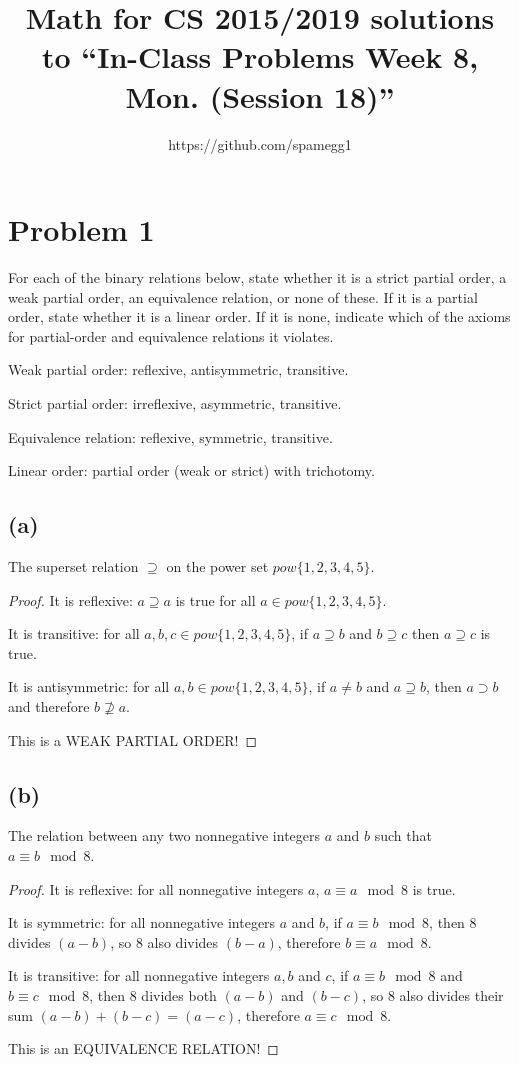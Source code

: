 \documentclass[14pt]{extarticle}
\title{Math for CS 2015/2019 solutions to ``In-Class Problems Week 8, Mon. (Session 18)''}
\author{https://github.com/spamegg1}
\begin{document}
\maketitle
\tableofcontents

\section{Problem 1}
For each of the binary relations below, state whether it is a strict partial order, a weak partial order, an equivalence relation, or none of these. If it is a partial order, state whether it is a linear order. If it is none, indicate which of the axioms for partial-order and equivalence relations it violates.

Weak partial order: reflexive, antisymmetric, transitive.

Strict partial order: irreflexive, asymmetric, transitive.

Equivalence relation: reflexive, symmetric, transitive.

Linear order: partial order (weak or strict) with trichotomy.

\subsection{(a)}
The superset relation $\supseteq$ on the power set $pow\{1, 2, 3, 4, 5\}$.
\begin{proof}
It is reflexive: $a \supseteq a$ is true for all $a \in pow\{1, 2, 3, 4, 5\}$.

It is transitive: for all $a, b, c \in pow\{1, 2, 3, 4, 5\}$, if $a \supseteq b$ and $b \supseteq c$ then $a \supseteq c$ is true.

It is antisymmetric: for all $a, b \in pow\{1,2,3,4,5\}$, if $a \neq b$ and $a \supseteq b$, then $a \supset b$ and therefore $b \nsupseteq a$.

This is a WEAK PARTIAL ORDER!
\end{proof}

\subsection{(b)}
The relation between any two nonnegative integers $a$ and $b$ such that $a \equiv b \mod 8$.
\begin{proof}
It is reflexive: for all nonnegative integers $a$, $a \equiv a \mod 8$ is true.

It is symmetric: for all nonnegative integers $a$ and $b$, if $a \equiv b \mod 8$, then 8 divides $(a - b)$, so 8 also divides $(b-a)$, therefore $b \equiv a \mod 8$.

It is transitive: for all nonnegative integers $a, b$ and $c$, if $a \equiv b \mod 8$ and $b \equiv c \mod 8$, then 8 divides both $(a-b)$ and $(b-c)$, so 8 also divides their sum $(a - b) + (b - c) = (a - c)$, therefore $a \equiv c \mod 8$.

This is an EQUIVALENCE RELATION!
\end{proof}
\end{document}
